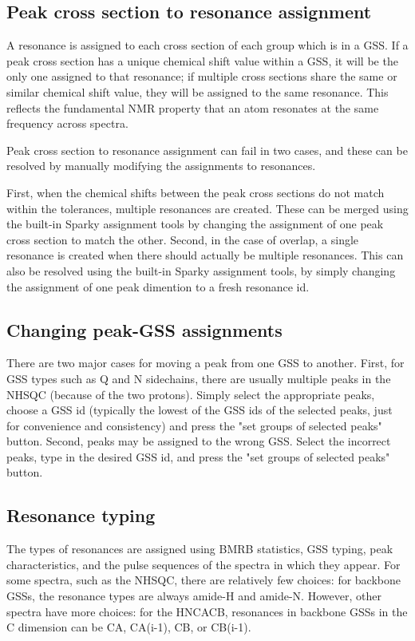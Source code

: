 \subsection{Peak cross section to resonance assignment}
A resonance is assigned to each cross section of each group which is in a GSS.
If a peak cross section has a unique chemical shift value within a GSS, it will
be the only one assigned to that resonance; if multiple cross sections share 
the same or similar chemical shift value, they will be assigned to the same
resonance.  This reflects the fundamental NMR property that an atom resonates
at the same frequency across spectra. 

Peak cross section to resonance assignment can fail in two cases, and these
can be resolved by manually modifying the assignments to resonances.

First, when the chemical shifts between the peak cross sections do not match
within the tolerances, multiple resonances are created.  These can be merged
using the built-in Sparky assignment tools by changing the assignment of one
peak cross section to match the other.
Second, in the case of overlap, a single resonance is created when there
should actually be multiple resonances.  This can also be resolved using 
the built-in Sparky assignment tools, by simply changing the assignment of
one peak dimention to a fresh resonance id.

\subsection{Changing peak-GSS assignments}
There are two major cases for moving a peak from one GSS to another.
First, for GSS types such as Q and N sidechains, there are usually multiple
peaks in the NHSQC (because of the two protons).  Simply select the appropriate
peaks, choose a GSS id (typically the lowest of the GSS ids of the selected
peaks, just for convenience and consistency) and press the "set groups of
selected peaks" button.
Second, peaks may be assigned to the wrong GSS.  Select the incorrect peaks,
type in the desired GSS id, and press the "set groups of selected peaks" button.

\subsection{Resonance typing}
The types of resonances are assigned using BMRB statistics, GSS typing, 
peak characteristics,
and the pulse sequences of the spectra in which they appear.  For some spectra,
such as the NHSQC, there are relatively few choices: for backbone GSSs,
the resonance types are always amide-H and amide-N.  However, other spectra
have more choices: for the HNCACB, resonances in backbone GSSs in the C
dimension can be CA, CA(i-1), CB, or CB(i-1).

